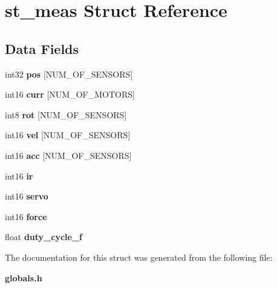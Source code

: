 \section{st\+\_\+meas Struct Reference}
\label{structst__meas}
\subsection*{Data Fields}
\begin{DoxyCompactItemize}
\item 
\mbox{\label{structst__meas_a3ee4913e7257d25d3e47cbbada9c8546}} 
int32 {\bfseries pos} [N\+U\+M\+\_\+\+O\+F\+\_\+\+S\+E\+N\+S\+O\+RS]
\item 
\mbox{\label{structst__meas_aec90a36a08ebccee4e4a476d2c6e82a5}} 
int16 {\bfseries curr} [N\+U\+M\+\_\+\+O\+F\+\_\+\+M\+O\+T\+O\+RS]
\item 
\mbox{\label{structst__meas_a26b47db1884c475bc42d76a709349f97}} 
int8 {\bfseries rot} [N\+U\+M\+\_\+\+O\+F\+\_\+\+S\+E\+N\+S\+O\+RS]
\item 
\mbox{\label{structst__meas_ad77c8d1a6800fe7da9ebed5c54a1e3b5}} 
int16 {\bfseries vel} [N\+U\+M\+\_\+\+O\+F\+\_\+\+S\+E\+N\+S\+O\+RS]
\item 
\mbox{\label{structst__meas_a3748adf2edf02ab9e3cd7f4fc5b0d2e6}} 
int16 {\bfseries acc} [N\+U\+M\+\_\+\+O\+F\+\_\+\+S\+E\+N\+S\+O\+RS]
\item 
\mbox{\label{structst__meas_ab348be48d334a17631f5e903c9970daa}} 
int16 {\bfseries ir}
\item 
\mbox{\label{structst__meas_a1350f7247a0831ee4668901a6150e2b1}} 
int16 {\bfseries servo}
\item 
\mbox{\label{structst__meas_afe4da6ac27bc16d2e0a965fd3b7c79a9}} 
int16 {\bfseries force}
\item 
\mbox{\label{structst__meas_a50ad0c89371ae2ecde0ec87e03ab13c6}} 
float {\bfseries duty\+\_\+cycle\+\_\+f}
\end{DoxyCompactItemize}


The documentation for this struct was generated from the following file\+:\begin{DoxyCompactItemize}
\item 
\textbf{ globals.\+h}\end{DoxyCompactItemize}
